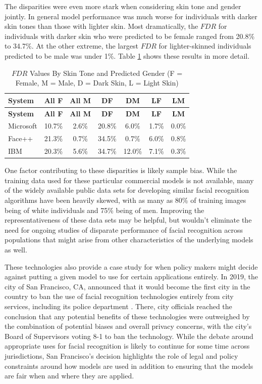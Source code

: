 \documentclass[]{krantz}
\begin{document}
The disparities were even more stark when considering skin tone and
gender jointly. In general model performance was much worse for
individuals with darker skin tones than those with lighter skin. Most
dramatically, the \(FDR\) for individuals with darker skin who were
predicted to be female ranged from 20.8\% to 34.7\%. At the other
extreme, the largest \(FDR\) for lighter-skinned individuals predicted
to be male was under 1\%. Table \ref{tab:facialrectable} shows these
results in more detail.

\begin{longtable}[]{@{}lcccccc@{}}
\caption{\label{tab:facialrectable} \(FDR\) Values By Skin Tone and
Predicted Gender (F = Female, M = Male, D = Dark Skin, L = Light
Skin)}\tabularnewline
\toprule
\textbf{System} & \textbf{All F} & \textbf{All M} & \textbf{DF} &
\textbf{DM} & \textbf{LF} & \textbf{LM}\tabularnewline
\midrule
\endfirsthead
\toprule
\textbf{System} & \textbf{All F} & \textbf{All M} & \textbf{DF} &
\textbf{DM} & \textbf{LF} & \textbf{LM}\tabularnewline
\midrule
\endhead
Microsoft & 10.7\% & 2.6\% & 20.8\% & 6.0\% & 1.7\% &
0.0\%\tabularnewline
Face++ & 21.3\% & 0.7\% & 34.5\% & 0.7\% & 6.0\% & 0.8\%\tabularnewline
IBM & 20.3\% & 5.6\% & 34.7\% & 12.0\% & 7.1\% & 0.3\%\tabularnewline
\bottomrule
\end{longtable}

One factor contributing to these disparities is likely sample bias.
While the training data used for these particular commercial models is
not available, many of the widely available public data sets for
developing similar facial recognition algorithms have been heavily
skewed, with as many as 80\% of training images being of white
individuals and 75\% being of men. Improving the representativeness of
these data sets may be helpful, but wouldn't eliminate the need for
ongoing studies of disparate performance of facial recognition across
populations that might arise from other characteristics of the
underlying models as well.

These technologies also provide a case study for when policy makers
might decide against putting a given model to use for certain
applications entirely. In 2019, the city of San Francisco, CA, announced
that it would become the first city in the country to ban the use of
facial recognition technologies entirely from city services, including
its police department \citep{harwell2019}. There, city officials reached
the conclusion that any potential benefits of these technologies were
outweighed by the combination of potential biases and overall privacy
concerns, with the city's Board of Supervisors voting 8-1 to ban the
technology. While the debate around appropriate uses for facial
recognition is likely to continue for some time across jurisdictions,
San Francisco's decision highlights the role of legal and policy
constraints around how models are used in addition to ensuring that the
models are fair when and where they are applied.
\end{document}
